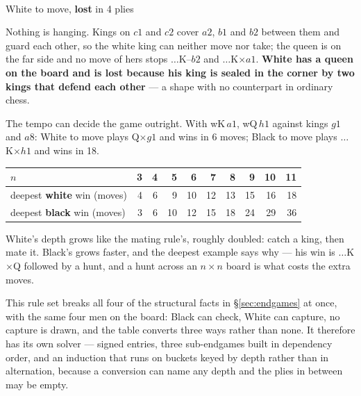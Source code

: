 \documentclass[11pt]{article}
\begin{document}
\begin{center}
\begin{minipage}{0.34\textwidth}\centering
  \\[1.5mm]
  {\small\color{kqkk}White to move, \textbf{lost} in 4 plies}
\end{minipage}\hspace{0.03\textwidth}
\begin{minipage}{0.58\textwidth}
\small
Nothing is hanging. Kings on $c1$ and $c2$ cover $a2$, $b1$ and $b2$ between
them and guard each other, so the white king can neither move nor take; the
queen is on the far side and no move of hers stops $\ldots$K--$b2$ and
$\ldots$K$\times a1$. \textbf{White has a queen on the board and is lost
because his king is sealed in the corner by two kings that defend each
other} --- a shape with no counterpart in ordinary chess.

\smallskip
The tempo can decide the game outright. With wK\,$a1$, wQ\,$h1$ against kings
$g1$ and $a8$: White to move plays Q$\times g1$ and wins in 6 moves; Black to
move plays $\ldots$K$\times h1$ and wins in 18.
\end{minipage}
\end{center}

\begin{center}\small
\begin{tabular}{@{}lrrrrrrrrr@{}}
\toprule
$n$ & 3 & 4 & 5 & 6 & 7 & 8 & 9 & 10 & 11 \\
\midrule
deepest \textbf{white} win (moves) & 4 & 6 & 9 & 10 & 12 & 13 & 15 & 16 & 18 \\
deepest \textbf{black} win (moves) & 3 & 6 & 10 & 12 & 15 & 18 & 24 & 29 & 36 \\
\bottomrule
\end{tabular}
\end{center}

\noindent
White's depth grows like the mating rule's, roughly doubled: catch a king, then
mate it. Black's grows faster, and the deepest example says why --- his win is
$\ldots$K$\times$Q followed by a hunt, and a hunt across an $n\times n$ board is
what costs the extra moves.

\medskip
\noindent
This rule set breaks all four of the structural facts in \S\ref{sec:endgames} at once, with the
same four men on the board: Black can check, White can capture, no capture is
drawn, and the table converts three ways rather than none. It therefore has its
own solver --- signed entries, three sub-endgames built in dependency order, and
an induction that runs on buckets keyed by depth rather than in alternation,
because a conversion can name any depth and the plies in between may be empty.
\end{document}
